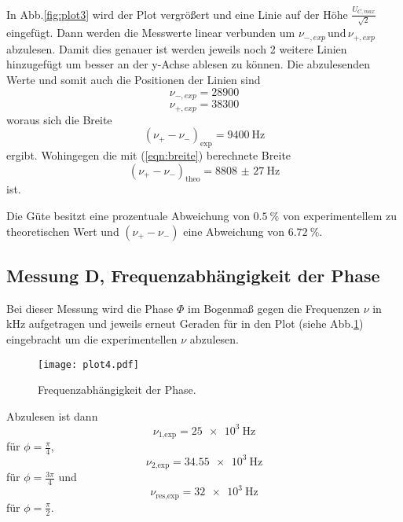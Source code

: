 In Abb.\ref{fig:plot3} wird der Plot vergrößert und eine Linie auf der Höhe
$\frac{U_{C,max}}{\sqrt{2}}$ eingefügt. Dann werden die Messwerte linear
verbunden um $\nu_{-,exp}\, \text{und}\,\nu_{+,exp}$ abzulesen. Damit dies
genauer ist werden jeweils noch 2 weitere Linien hinzugefügt um besser an der y-Achse
ablesen zu können.
Die abzulesenden Werte und somit auch die Positionen der Linien sind
\begin{equation*}
  \nu_{-,exp} = 28900
\end{equation*}
\begin{equation*}
  \nu_{+,exp} = 38300
\end{equation*}
woraus sich die Breite
\begin{equation*}
  (\nu_{+}-\nu_{-})_{\text{exp}} = \SI{9400}{\hertz}
\end{equation*}
ergibt. Wohingegen die mit (\ref{eqn:breite}) berechnete Breite
\begin{equation*}
  (\nu_{+}-\nu_{-})_{\text{theo}} = \SI{8808(27)}{\hertz}
\end{equation*}
ist.

Die Güte besitzt eine prozentuale Abweichung von $\SI{0.5}{\percent}$ von experimentellem
zu theoretischen Wert und $(\nu_{+}-\nu_{-})$ eine Abweichung von $\SI{6.72}{\percent}$.

\subsection{Messung D, Frequenzabhängigkeit der Phase}

Bei dieser Messung wird die Phase $\Phi$ im Bogenmaß gegen die Frequenzen $\nu$ in kHz aufgetragen
und jeweils erneut Geraden für in den Plot (siehe Abb.\ref{fig:plot4}) eingebracht um die
experimentellen $\nu$ abzulesen.
\begin{figure}
  \centering
  \texttt{[image: plot4.pdf]}
  \caption{Frequenzabhängigkeit der Phase.}
  \label{fig:plot4}
\end{figure}
Abzulesen ist dann
\begin{equation*}
  \nu_{\text{1,exp}} = \SI{25e3}{\hertz}
\end{equation*}
für $\phi = \frac{\pi}{4}$,
\begin{equation*}
  \nu_{\text{2,exp}} = \SI{34.55e3}{\hertz}
\end{equation*}
für $\phi = \frac{3\pi}{4}$ und
\begin{equation*}
  \nu_{\text{res,exp}} = \SI{32e3}{\hertz}
\end{equation*}
für $\phi = \frac{\pi}{2}$.

